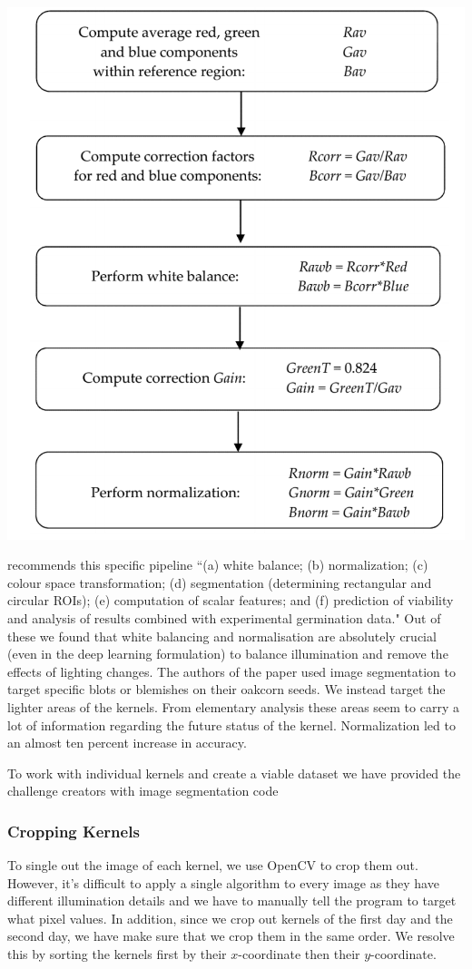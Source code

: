 \documentclass[letterpaper, 10 pt, conference]{ieeeconf}  %
\begin{document}
{\centering \includegraphics[scale = 0.4]{preprocessing.png} \par}
\cite{Jablonski2016ColourBasedBD} recommends this specific pipeline 
``(a) white balance; (b) normalization; (c) colour space transformation;
(d) segmentation (determining rectangular and circular ROIs); (e) computation of scalar features; and
(f) prediction of viability and analysis of results combined with experimental germination data." Out of these we found that white balancing and normalisation are absolutely crucial (even in the deep learning formulation) to balance illumination and remove the effects of lighting changes. The authors of the paper used image segmentation to target specific blots or blemishes on their oakcorn seeds. We instead target the lighter areas of the kernels. From elementary analysis these areas seem to carry a lot of information regarding the future status of the kernel. Normalization led to an almost ten percent increase in accuracy. 

To work with individual kernels and create a viable dataset we have provided the challenge creators with image segmentation code

\subsubsection{Cropping Kernels}
To single out the image of each kernel, we use OpenCV to crop them out. However, it's difficult to apply a single algorithm to every image as they have different illumination details and we have to manually tell the program to target what pixel values.
In addition, since we crop out kernels of the first day and the second day, we have make sure that we crop them in the same order. We resolve this by sorting the kernels first by their $x$-coordinate then their $y$-coordinate.
\end{document}
